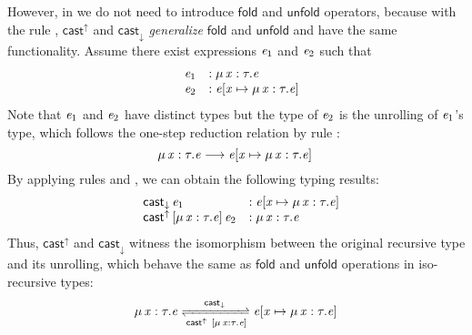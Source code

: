 However, in \name we do not need to introduce $ \mathsf{fold} $ and
$ \mathsf{unfold} $ operators, because with the rule ,
$ \mathsf{cast}^{\uparrow} $ and $ \mathsf{cast}_{\downarrow} $ \emph{generalize} $ \mathsf{fold} $ and
$ \mathsf{unfold} $ and have the same functionality. Assume there exist
expressions $\mathit{e_{{\mathrm{1}}}}$ and $\mathit{e_{{\mathrm{2}}}}$ such that
\[\begin{array}{lll}
	&\mathit{e_{{\mathrm{1}}}} &: \mu \, \mathit{x}  :  \tau  .  \mathit{e}\\
	&\mathit{e_{{\mathrm{2}}}} &: \mathit{e}  [  \mathit{x}  \mapsto  \mu \, \mathit{x}  :  \tau  .  \mathit{e}  ] \,
\end{array}\]
Note that $\mathit{e_{{\mathrm{1}}}}$ and $\mathit{e_{{\mathrm{2}}}}$ have distinct types but the type of $\mathit{e_{{\mathrm{2}}}}$ is
the unrolling of $\mathit{e_{{\mathrm{1}}}}$'s type, which follows the one-step reduction relation
by rule :
\[ \mu \, \mathit{x}  :  \tau  .  \mathit{e}  \longrightarrow  \mathit{e}  [  \mathit{x}  \mapsto  \mu \, \mathit{x}  :  \tau  .  \mathit{e}  ] \, \]
By applying rules  and , we can obtain
the following typing results:
\[\begin{array}{lll}
	&\mathsf{cast}_{\downarrow} \, \mathit{e_{{\mathrm{1}}}} &: \mathit{e}  [  \mathit{x}  \mapsto  \mu \, \mathit{x}  :  \tau  .  \mathit{e}  ] \,\\
	&\mathsf{cast}^{\uparrow} \, [  \mu \, \mathit{x}  :  \tau  .  \mathit{e}  ] \,  \mathit{e_{{\mathrm{2}}}} &: \mu \, \mathit{x}  :  \tau  .  \mathit{e}
\end{array}\]
Thus, $ \mathsf{cast}^{\uparrow} $ and $ \mathsf{cast}_{\downarrow} $ witness the isomorphism between the
original recursive type and its unrolling, which behave the same as $ \mathsf{fold} $
and $ \mathsf{unfold} $ operations in iso-recursive types:
\begin{align*}
  \mu \, \ottmv{x}  \ottsym{:}  \tau  \ottsym{.}  \ottnt{e} \xrightleftharpoons[{ \mathsf{cast}^{\uparrow} ~[ \mu \, \ottmv{x}  \ottsym{:}  \tau  \ottsym{.}  \ottnt{e}
  ]}]{ \mathsf{cast}_{\downarrow} } \ottnt{e}  \ottsym{[}  \ottmv{x}  \mapsto  \mu \, \ottmv{x}  \ottsym{:}  \tau  \ottsym{.}  \ottnt{e}  \ottsym{]} \,
\end{align*}


